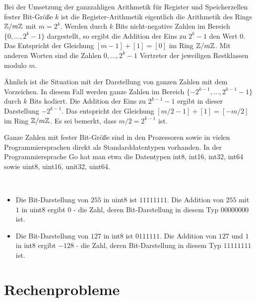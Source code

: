 \begin{bem}
		Bei der Umsetzung der ganzzahligen Arithmetik für Register und Speicherzellen fester Bit-Größe $k$ ist die Register-Arithmetik eigentlich die Arithmetik des Rings $\mathbb{Z} / m \mathbb{Z}$ mit $m=2^k$. Werden durch $k$ Bits nicht-negative Zahlen im Bereich $\{0,\ldots,2^k-1\}$ dargestellt, so ergibt die Addition der Eins zu $2^k-1$ den Wert $0$. Das Entspricht der Gleichung $[m-1] + [1] = [0]$ im Ring $\mathbb{Z} / m \mathbb{Z}$. Mit anderen Worten sind die Zahlen $0,\ldots,2^k-1$ Vertreter der jeweiligen Restklassen modulo $m$. 
		
		Ähnlich ist die Situation mit der Darstellung von ganzen Zahlen mit dem Vorzeichen. In diesem Fall werden ganze Zahlen im Bereich  $\{-2^{k-1},\ldots,2^{k-1}  - 1\}$ durch $k$ Bits kodiert. Die Addition der Eins zu $2^{k-1}-1$ ergibt in dieser Darstellung $-2^{k-1}$. Das entspricht der Gleichung $[m/2-1] + [1] =[-m/2]$ im Ring $\mathbb{Z} / m \mathbb{Z}$. Es sei bemerkt, dass  $m/2=2^{k-1}$ ist.
		
		Ganze Zahlen mit fester Bit-Größe sind in den Prozessoren sowie in vielen Programmiersprachen direkt als Standarddatentypen vorhanden. In der Programmiersprache Go hat man etwa die Datentypen int8, int16, int32, int64 sowie uint8, uint16, unit32, uint64. 
\end{bem} 

\begin{bsp}\ 
	\begin{itemize} 
		\item Die Bit-Darstellung von $255$ in uint8 ist $11111111$. Die Addition von $255$ mit $1$ in uint8 ergibt $0$ - die Zahl, deren Bit-Darstellung in diesem Typ $00000000$ ist.  
		\item Die Bit-Darstellung von $127$ in int8 ist $0111111$. Die Addition von $127$ und $1$ in int8 ergibt $-128$ - die Zahl, deren Bit-Darstellung in diesem Typ $11111111$ ist. 
	\end{itemize} 
\end{bsp}



\section{Rechenprobleme}
\label{sect:rechenprobleme}

